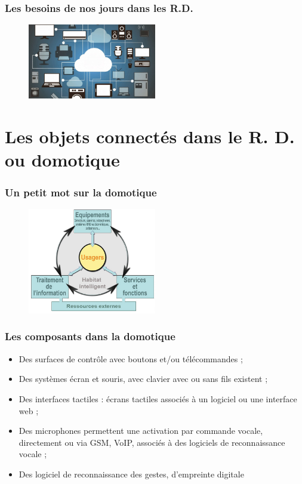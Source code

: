 \documentclass[handout]{beamer}
\begin{document}
\begin{frame}\frametitle{Les besoins de nos jours dans les R.D.} 
\begin{figure}
		\centering
		\includegraphics[width=0.5\textwidth,natwidth=100,natheight=100]{image/domotique.jpg}
\end{figure}
\end{frame}

\section{Les objets connectés dans le R. D. ou domotique }
\begin{frame}\frametitle{Un petit mot sur la domotique} 
\begin{figure}
		\centering
		\includegraphics[width=0.5\textwidth,natwidth=100,natheight=100]{image/domotique.png}
\end{figure}
\end{frame}

\begin{frame}\frametitle{Les composants dans la domotique} 
\begin{itemize}
\item  Des surfaces de contrôle avec boutons et/ou télécommandes ;
\item Des systèmes écran et souris, avec clavier avec ou sans fils existent ;
\item  Des interfaces tactiles : écrans tactiles  associés à un logiciel ou une interface web ;
\item Des microphones permettent une activation par commande vocale,  directement ou via GSM, VoIP, associés à des logiciels de reconnaissance vocale ;
\item Des logiciel de reconnaissance des gestes, d'empreinte digitale
\end{itemize}
\end{frame}
\end{document}

